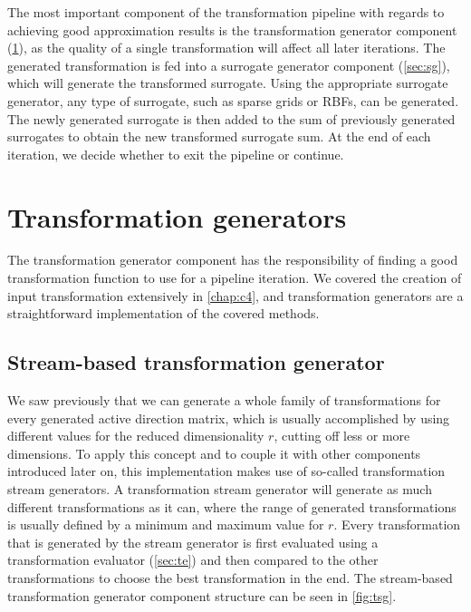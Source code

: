 \documentclass[
  a4paper,  %
  twoside,  %
  bibliography=totoc,
  headsepline,
  cleardoublepage=empty,
  parskip=half,
  draft=false
]{scrbook}
\begin{document}
%
The most important component of the transformation pipeline with regards to achieving good approximation results is the transformation generator component (\cref{sec:tg}), as the quality of a single transformation will affect all later iterations.
The generated transformation is fed into a surrogate generator component (\cref{sec:sg}), which will generate the transformed surrogate.
Using the appropriate surrogate generator, any type of surrogate, such as sparse grids or RBFs, can be generated.
The newly generated surrogate is then added to the sum of previously generated surrogates to obtain the new transformed surrogate sum.
At the end of each iteration, we decide whether to exit the pipeline or continue.

\newpage
\section {Transformation generators}
\label{sec:tg}

The transformation generator component has the responsibility of finding a good transformation function to use for a pipeline iteration.
We covered the creation of input transformation extensively in \cref{chap:c4}, and transformation generators are a straightforward implementation of the covered methods.

\subsection {Stream-based transformation generator}
\label{sec:tsg}

We saw previously that we can generate a whole family of transformations for every generated active direction matrix, which is usually accomplished by using different values for the reduced dimensionality $r$, \ie cutting off less or more dimensions.
To apply this concept and to couple it with other components introduced later on, this implementation makes use of so-called transformation stream generators.
A transformation stream generator will generate as much different transformations as it can, where the range of generated transformations is usually defined by a minimum and maximum value for $r$.
Every transformation that is generated by the stream generator is first evaluated using a transformation evaluator (\cref{sec:te}) and then compared to the other transformations to choose the best transformation in the end.
The stream-based transformation generator component structure can be seen in \cref{fig:tsg}.
\end{document}
